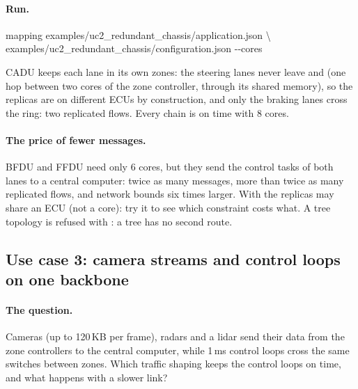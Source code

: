 \paragraph{Run.}
\begin{shell}
mapping examples/uc2\_redundant\_chassis/application.json \textbackslash\\
\quad examples/uc2\_redundant\_chassis/configuration.json -{}-cores
\end{shell}
\listing[\fontsize{4.8pt}{5.8pt}\selectfont]{listings/uc2_chains.txt}
CADU keeps each lane in its own zones: the steering lanes never leave
 and  (one hop between two cores of the zone
controller, through its shared memory), so the replicas are on different
ECUs by construction, and only the braking lanes cross the ring: two
replicated flows. Every chain is on time with 8 cores.

\paragraph{The price of fewer messages.}
BFDU and FFDU need only 6 cores, but they send the control tasks of both
lanes to a central computer: twice as many messages, more than twice as
many replicated flows, and network bounds six times larger. With
 the replicas may share an ECU (not a core): try it
to see which constraint costs what. A tree topology is refused with
: a tree has no second route.

\subsection{Use case 3: camera streams and control loops on one backbone}
\label{sec:uc3}

\paragraph{The question.} Cameras (up to 120\,KB per frame), radars and a
lidar send their data from the zone controllers to the central computer,
while 1\,ms control loops cross the same switches between zones. Which
traffic shaping keeps the control loops on time, and what happens with a
slower link?

